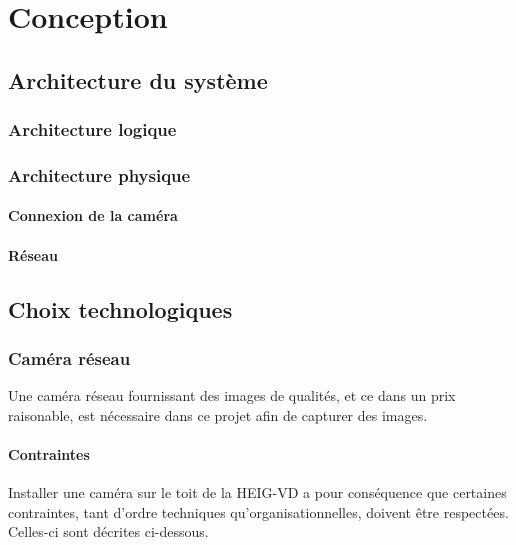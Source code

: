 \chapter{Conception}

\section{Architecture du système}\label{conception.architecture}

\subsection{Architecture logique}


\subsection{Architecture physique}
\subsubsection{Connexion de la caméra}\label{conception.architecture.physique.camera}

\subsubsection{Réseau}



\section{Choix technologiques}

\subsection{Caméra réseau}
Une caméra réseau fournissant des images de qualités, et ce dans un prix raisonable, est nécessaire dans ce projet afin de capturer des images. 


\subsubsection{Contraintes}
Installer une caméra sur le toit de la HEIG-VD a pour conséquence que certaines contraintes, tant d'ordre techniques qu'organisationnelles, doivent être respectées. Celles-ci sont décrites ci-dessous.

